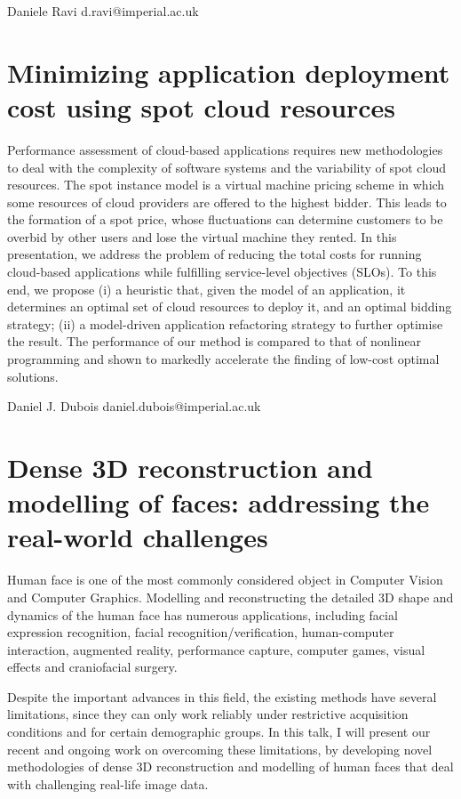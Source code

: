 \documentclass{article}
\begin{document}
Daniele Ravi
d.ravi@imperial.ac.uk
\section*{Minimizing application deployment cost using spot cloud resources}


Performance assessment of cloud-based applications requires new methodologies to
deal with the complexity of software systems and the variability of spot cloud
resources. The spot instance model is a virtual machine pricing scheme in which
some resources of cloud providers are offered to the highest bidder. This leads
to the formation of a spot price, whose fluctuations can determine customers to
be overbid by other users and lose the virtual machine they rented. In this
presentation, we address the problem of reducing the total costs for running
cloud-based applications while fulfilling service-level objectives (SLOs). To
this end, we propose (i) a heuristic that, given the model of an application, it
determines an optimal set of cloud resources to deploy it, and an optimal
bidding strategy; (ii) a model-driven application refactoring strategy to
further optimise the result. The performance of our method is compared to that
of nonlinear programming and shown to markedly accelerate the finding of
low-cost optimal solutions.


Daniel J. Dubois
daniel.dubois@imperial.ac.uk
\section*{Dense 3D reconstruction and modelling of faces: addressing the
real-world challenges}


Human face is one of the most commonly considered object in
Computer Vision and Computer Graphics. Modelling and reconstructing the detailed
3D shape and dynamics of the human face has numerous applications, including
facial expression recognition, facial recognition/verification, human-computer
interaction, augmented reality, performance capture, computer games, visual
effects and craniofacial surgery.

Despite the important advances in this field, the existing methods have several
limitations, since they can only work reliably under restrictive acquisition
conditions and for certain demographic groups. In this talk, I will present our
recent and ongoing work on overcoming these limitations, by developing novel
methodologies of dense 3D reconstruction and modelling of human faces that deal
with challenging real-life image data.
\end{document}
